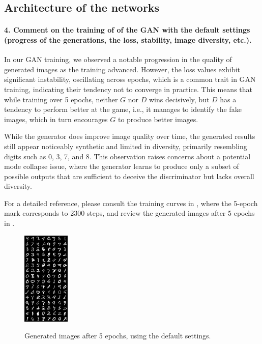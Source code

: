 \subsection{Architecture of the networks}

\paragraph*{4. Comment on the training of of the GAN with the default settings (progress of the generations, the loss, stability, image diversity, etc.).}

In our GAN training, we observed a notable progression in the quality of generated images as the training advanced. However, the loss values exhibit significant instability, oscillating across epochs, which is a common trait in GAN training, indicating their tendency not to converge in practice. This means that while training over 5 epochs, neither $G$ nor $D$ wins decisively, but $D$ has a tendency to perform better at the game, i.e., it manages to identify the fake images, which in turn encourages $G$ to produce better images. 

While the generator does improve image quality over time, the generated results still appear noticeably synthetic and limited in diversity, primarily resembling digits such as 0, 3, 7, and 8. This observation raises concerns about a potential mode collapse issue, where the generator learns to produce only a subset of possible outputs that are sufficient to deceive the discriminator but lacks overall diversity.

For a detailed reference, please consult the training curves in , where the 5-epoch mark corresponds to 2300 steps, and review the generated images after 5 epochs in .

\begin{figure}[H]
    \centering
    \includegraphics[width=0.2\textwidth]{default.png}
    \label{fig:default}
    \caption{Generated images after 5 epochs, using the default settings.}
\end{figure}

